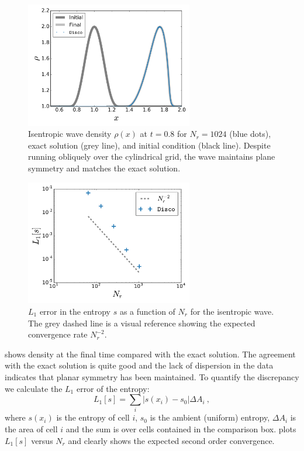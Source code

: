 \begin{figure}
\begin{center}
	\includegraphics[width=0.65\textwidth]{figures/numerics/isen_1024.png}
\end{center}
\caption{Isentropic wave density $\rho(x)$ at $t=0.8$ for $N_r=1024$ (blue dots), exact solution (grey line), and initial condition (black line).  Despite running obliquely over the cylindrical grid, the wave maintains plane symmetry and matches the exact solution. }
\end{figure}
\begin{figure}
\begin{center}
	\includegraphics[width=0.65\textwidth]{figures/numerics/isen_conv.pdf}
\end{center}
\caption{$L_1$ error in the entropy $s$ as a function of $N_r$ for the isentropic wave.  The grey dashed line is a visual reference showing the expected convergence rate $N^{-2}_r$.  }
\end{figure}

 shows density at the final time compared with the exact solution.  The agreement with the exact solution is quite good and the lack of dispersion in the data indicates that planar symmetry has been maintained.  To quantify the discrepancy we calculate the $L_1$ error of the entropy:
\begin{equation}
	L_1[s] = \sum_i |s(x_i)-s_0| \Delta A_i\ ,
\end{equation}
where $s(x_i)$ is the entropy of cell $i$, $s_0$ is the ambient (uniform) entropy, $\Delta A_i$ is the area of cell $i$ and the sum is over cells contained in the comparison box.   plots $L_1[s]$ versus $N_r$ and clearly shows the expected second order convergence.

